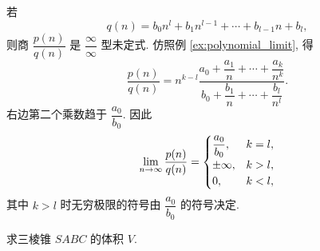 \label{ex:rational_polynomial_limit}
若
$$
q(n)=b_0n^l+b_1n^{l-1}+\cdots+b_{l-1}n+b_l,
$$
则商 $\dfrac{p(n)}{q(n)}$ 是 $\dfrac{\infty}{\infty}$ 型未定式. 仿照例 \ref{ex:polynomial_limit}, 得
$$
\frac{p(n)}{q(n)}
=n^{k-l}
\frac{a_0+\dfrac{a_1}{n}+\cdots+\dfrac{a_k}{n^k}}
{b_0+\dfrac{b_1}{n}+\cdots+\dfrac{b_l}{n^l}}.
$$
右边第二个乘数趋于 $\dfrac{a_0}{b_0}$. 因此
$$
\lim\limits_{n \to \infty}\frac{p(n)}{q(n)}
=
\begin{cases}
\dfrac{a_0}{b_0}, & k=l,\\[4pt]
\pm\infty, & k>l,\\
0, & k<l,
\end{cases}
$$
其中 $k>l$ 时无穷极限的符号由 $\dfrac{a_0}{b_0}$ 的符号决定.

\label{ex:pyramid_volume}
求三棱锥 $SABC$ 的体积 $V$.

